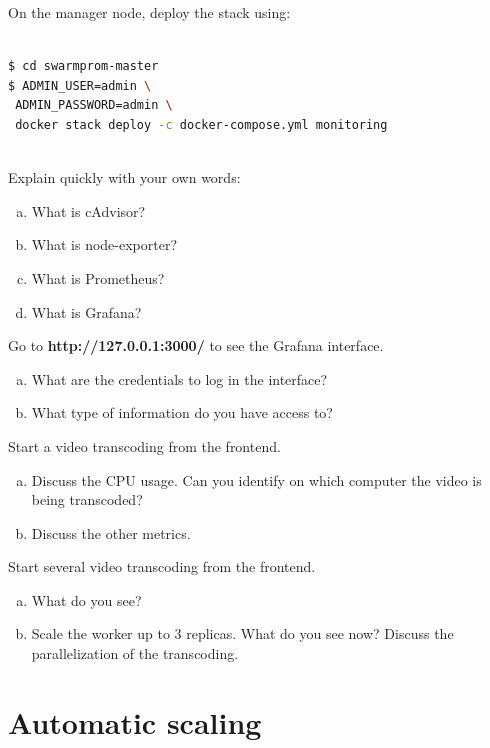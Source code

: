 \documentclass[a4paper,11pt]{exam}
\begin{document}
On the manager node, deploy the stack using: 

\begin{lstlisting}[frame=single,language={sh}]  % Start your code-block

$ cd swarmprom-master
$ ADMIN_USER=admin \
 ADMIN_PASSWORD=admin \
 docker stack deploy -c docker-compose.yml monitoring
 
\end{lstlisting}

\begin{questions}

	\question Explain quickly with your own words:
	\begin{enumerate}[(a)]
		\item What is cAdvisor?
		\item What is node-exporter?
		\item What is Prometheus?
		\item What is Grafana?
	\end{enumerate}
	
	\question Go to \textbf{http://127.0.0.1:3000/} to see the Grafana interface.
	\begin{enumerate}[(a)]
		\item What are the credentials to log in the interface?
		\item What type of information do you have access to?
	\end{enumerate}
	
	\question Start a video transcoding from the frontend.
	\begin{enumerate}[(a)]
		\item Discuss the CPU usage. Can you identify on which computer the video is being transcoded?
		\item Discuss the other metrics.
	\end{enumerate}

	\question Start several video transcoding from the frontend.
	\begin{enumerate}[(a)]
		\item What do you see?  
		\item Scale the worker up to 3 replicas. What do you see now? Discuss the parallelization of the transcoding.
	\end{enumerate}
	
\end{questions}

\clearpage

\section{Automatic scaling}
\end{document}
